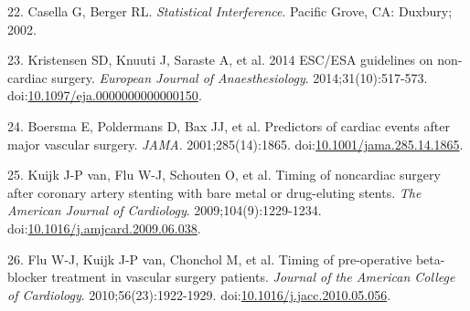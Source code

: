 \documentclass[]{article}
\begin{document}
\hypertarget{ref-casella2002}{}
22. Casella G, Berger RL. \emph{Statistical Interference}. Pacific
Grove, CA: Duxbury; 2002.

\hypertarget{ref-Kristensen_2014}{}
23. Kristensen SD, Knuuti J, Saraste A, et al. 2014 ESC/ESA guidelines
on non-cardiac surgery. \emph{European Journal of Anaesthesiology}.
2014;31(10):517-573.
doi:\href{https://doi.org/10.1097/eja.0000000000000150}{10.1097/eja.0000000000000150}.

\hypertarget{ref-Boersma_2001}{}
24. Boersma E, Poldermans D, Bax JJ, et al. Predictors of cardiac events
after major vascular surgery. \emph{JAMA}. 2001;285(14):1865.
doi:\href{https://doi.org/10.1001/jama.285.14.1865}{10.1001/jama.285.14.1865}.

\hypertarget{ref-van_Kuijk_2009}{}
25. Kuijk J-P van, Flu W-J, Schouten O, et al. Timing of noncardiac
surgery after coronary artery stenting with bare metal or drug-eluting
stents. \emph{The American Journal of Cardiology}.
2009;104(9):1229-1234.
doi:\href{https://doi.org/10.1016/j.amjcard.2009.06.038}{10.1016/j.amjcard.2009.06.038}.

\hypertarget{ref-Flu_2010}{}
26. Flu W-J, Kuijk J-P van, Chonchol M, et al. Timing of pre-operative
beta-blocker treatment in vascular surgery patients. \emph{Journal of
the American College of Cardiology}. 2010;56(23):1922-1929.
doi:\href{https://doi.org/10.1016/j.jacc.2010.05.056}{10.1016/j.jacc.2010.05.056}.
\end{document}
